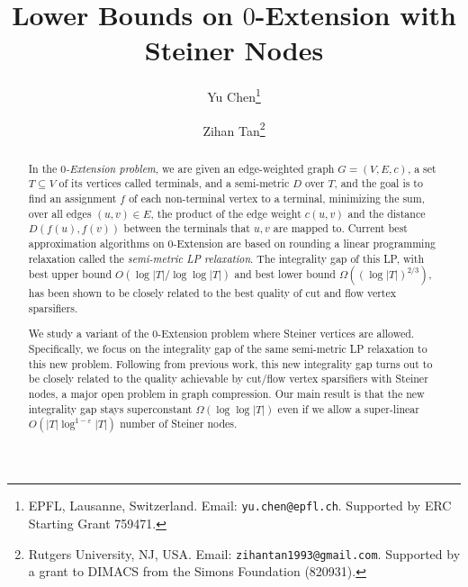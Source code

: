 \documentclass[11pt]{article}
\theoremstyle{definition}
\begin{document}
\begin{titlepage}
	
	\title{Lower Bounds on $0$-Extension with Steiner Nodes}
	
	\author{Yu Chen\thanks{EPFL, Lausanne, Switzerland. Email: {\tt yu.chen@epfl.ch}. Supported by ERC Starting Grant 759471.} \and Zihan Tan\thanks{Rutgers University, NJ, USA. Email: {\tt zihantan1993@gmail.com}. Supported by a grant to DIMACS from the Simons Foundation (820931).}} 
	
	\maketitle
	
	
	\thispagestyle{empty}
	\begin{abstract}
		
In the \emph{$0$-Extension problem}, we are given an edge-weighted graph $G=(V,E,c)$, a set $T\subseteq V$ of its vertices called terminals, and a semi-metric $D$ over $T$, and the goal is to find an assignment $f$ of each non-terminal vertex to a terminal, minimizing the sum, over all edges $(u,v)\in E$, the product of the edge weight $c(u,v)$ and the distance $D(f(u),f(v))$ between the terminals that $u,v$ are mapped to.
Current best approximation algorithms on $0$-Extension are based on rounding a linear programming relaxation called the \emph{semi-metric LP relaxation}. The integrality gap of this LP, with best upper bound $O(\log |T|/\log\log |T|)$ and best lower bound $\Omega((\log |T|)^{2/3})$, has been shown to be closely related to the best quality of cut and flow vertex sparsifiers.

We study a variant of the $0$-Extension problem where Steiner vertices are allowed. Specifically, we focus on the integrality gap of the same semi-metric LP relaxation to this new problem. 
Following from previous work, this new integrality gap turns out to be closely related to the quality achievable by cut/flow vertex sparsifiers with Steiner nodes, a major open problem in graph compression. 
Our main result is that the new integrality gap stays superconstant $\Omega(\log\log |T|)$ even if we allow a super-linear $O(|T|\log^{1-\varepsilon}|T|)$ number of Steiner nodes.
		
		
		
		
		
		
		
		
		
	\end{abstract}
\end{titlepage}
\end{document}
